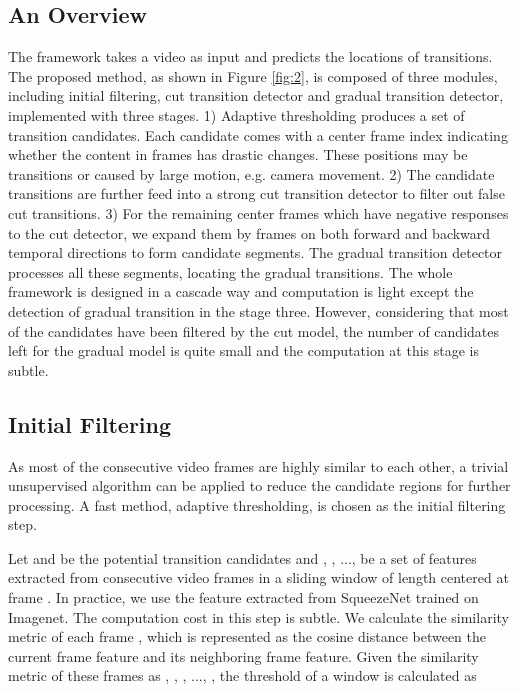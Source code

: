 \documentclass[runningheads]{llncs}
\begin{document}
\subsection{An Overview}
The framework takes a video as input and predicts the locations of transitions. The proposed method, as shown in Figure \ref{fig:2}, is composed of three modules, including initial filtering, cut transition detector and gradual transition detector, implemented with three stages. 1) Adaptive thresholding produces a set of transition candidates. Each candidate comes with a center frame index indicating whether the content in frames has drastic changes. These positions may be transitions or caused by large motion, e.g. camera movement. 2) The candidate transitions are further feed into a strong cut transition detector to filter out false cut transitions. 3) For the remaining center frames which have negative responses to the cut detector, we expand them by  frames on both forward and backward temporal directions to form candidate segments. The gradual transition detector processes all these segments, locating the gradual transitions. The whole framework is designed in a cascade way and computation is light except the detection of gradual transition in the stage three. However, considering that most of the candidates have been filtered by the cut model, the number of candidates left for the gradual model is quite small and the computation at this stage is subtle.

\subsection{Initial Filtering}
As most of the consecutive video frames are highly similar to each other, a trivial unsupervised algorithm can be applied to reduce the candidate regions for further processing. A fast method, adaptive thresholding, is chosen as the initial filtering step. 

Let  and  be the potential transition candidates and , , ...,  be a set of features extracted from consecutive video frames in a sliding window of length  centered at frame . In practice, we use the feature extracted from SqueezeNet\cite{iandola2016squeezenet} trained on Imagenet\cite{deng2009imagenet}. The computation cost in this step is subtle. We calculate the similarity metric of each frame , which is represented as the cosine distance between the current frame feature and its neighboring frame feature. Given the similarity metric of these frames as , , , ..., , the threshold of a window is calculated as
\end{document}
